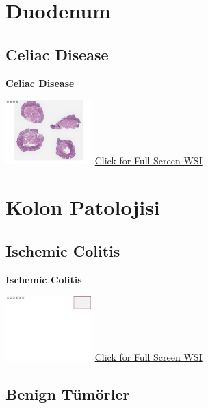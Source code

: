 \documentclass[
  letterpaper,
  paper=6in:9in,
  pagesize=pdftex,
  headinclude=on,
  footinclude=on,
  12pt]{scrbook}
\begin{document}
\hypertarget{sec-duodenum}{%
\chapter{Duodenum}\label{sec-duodenum}}

\hypertarget{sec-celiac-disease}{%
\section{Celiac Disease}\label{sec-celiac-disease}}

\textbf{Celiac Disease}

\href{https://images.patolojiatlasi.com/celiac-disease/HE.html}{\includegraphics[width=0.25\textwidth,height=\textheight]{./screenshots/celiac-disease_screenshot.png}}
\href{https://images.patolojiatlasi.com/celiac-disease/HE.html}{Click
for Full Screen WSI}

\hypertarget{kolon-patolojisi}{%
\chapter{Kolon Patolojisi}\label{kolon-patolojisi}}

\hypertarget{sec-ischemic-colitis}{%
\section{Ischemic Colitis}\label{sec-ischemic-colitis}}

\textbf{Ischemic Colitis}

\href{https://images.patolojiatlasi.com/template/HE.html}{\includegraphics[width=0.25\textwidth,height=\textheight]{./screenshots/template_screenshot.png}}
\href{https://images.patolojiatlasi.com/ischemic-colitis/HE.html}{Click
for Full Screen WSI}

\hypertarget{sec-kolon-benign-tumorler}{%
\section{Benign Tümörler}\label{sec-kolon-benign-tumorler}}
\end{document}
